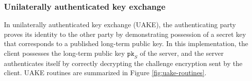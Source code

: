 \documentclass[journal=tches,submission]{iacrtrans}
\newcommand{\pk}{\texttt{pk}}
\newcommand{\us}{\mu s}
\begin{document}
\begin{table}[h]
\end{table}

\subsubsection{Unilaterally authenticated key exchange}\label{sec:uakex}
In unilaterally authenticated key exchange (UAKE), the authenticating party proves its identity to the other party by demonstrating possession of a secret key that corresponds to a published long-term public key. In this implementation, the client possesses the long-term public key $\pk_S$ of the server, and the server authenticates itself by correctly decrypting the challenge encryption sent by the client. UAKE routines are summarized in Figure \ref{fig:uake-routines}.
\end{document}
